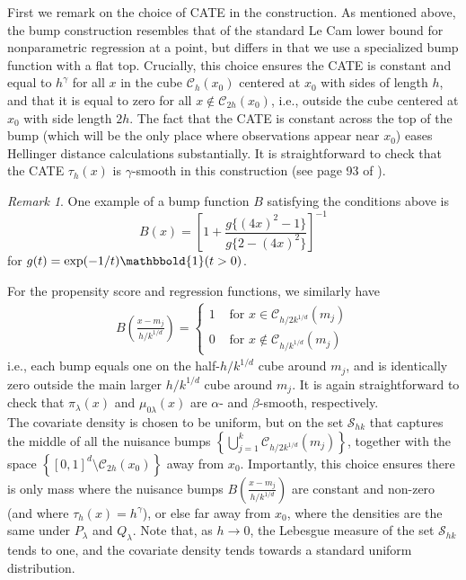 \documentclass[11pt,twoside]{article}
\newcommand{\one}{\mathbbold{1}}
\theoremstyle{definition}
\theoremstyle{remark}
\newtheorem{remark}{Remark}
\begin{document}
\bigskip


First we remark on the choice of CATE in the construction. As mentioned above, the bump construction resembles that of the standard Le Cam lower bound for nonparametric regression at a point, but differs in that we use a specialized  bump function with a flat top. Crucially, this choice ensures the CATE  is constant and equal to $h^\gamma$ for all $x$ in the cube $\mathcal{C}_h(x_0)$ centered at $x_0$ with sides of length $h$, and  that it is equal to zero for all $x \notin \mathcal{C}_{2h}(x_0)$, i.e., outside the cube  centered at $x_0$ with side length $2h$. The fact that the CATE is constant  across the top of the bump (which will be the only place where observations appear near $x_0$) eases Hellinger distance calculations substantially. It is straightforward to check that the CATE $\tau_h(x)$ is $\gamma$-smooth in this construction (see page 93 of \citet{tsybakov2009introduction}).   \\

\begin{remark}
One example of a bump function $B$ satisfying the conditions above is 
$$ B(x) =  \left[ 1 + \frac{ g\{(4x)^2-1\} }{ g\{2-(4x)^2\} } \right]^{-1} $$
for $g(t) = \exp(-1/t) \one(t>0)$. \\
\end{remark}

For the propensity score and regression functions, we similarly have
\begin{align*}
B \left( \frac{x-m_j}{h/k^{1/d}}  \right) = \begin{cases}
1 & \text{ for } x \in \mathcal{C}_{h/2k^{1/d}}(m_j) \\
0 & \text{ for } x \notin \mathcal{C}_{h/k^{1/d}}(m_j) 
\end{cases}
\end{align*}
i.e., each bump equals one on the half-$h/k^{1/d}$ cube around $m_j$, and is identically zero outside the main  larger $h/k^{1/d}$ cube around $m_j$. It is again straightforward to check that $\pi_\lambda(x)$ and $\mu_{0\lambda}(x)$ are $\alpha$- and $\beta$-smooth, respectively. \\
 
The covariate density is chosen to be uniform, but on the set $\mathcal{S}_{hk}$  that captures the middle of all the nuisance bumps $\left\{ \bigcup_{j=1}^k \mathcal{C}_{h/2k^{1/d}}(m_j) \right\}$, together with the space $\left\{ [0,1]^d \setminus \mathcal{C}_{2h}(x_0) \right\}$ away from $x_0$. Importantly, this choice ensures there is only mass where the nuisance bumps $B \left( \frac{x-m_j}{h/k^{1/d}}  \right)$ are constant and non-zero (and where $\tau_h(x)=h^\gamma$), or else far away from $x_0$, where the densities are the same under $P_\lambda$ and $Q_\lambda$. Note that, as $h \rightarrow 0$, the Lebesgue measure of the set $\mathcal{S}_{hk}$ tends to one, and the covariate density tends towards a standard uniform distribution.  \\
\end{document}
